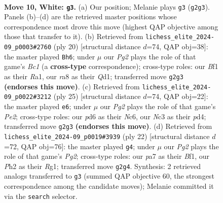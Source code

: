 \documentclass[11pt]{article}
\begin{document}
\clearpage

\begin{figure}[p]\centering
\begin{subfigure}{0.46\textwidth}\centering
\resizebox{\linewidth}{!}{%
\newchessgame
\chessboard[
  setfen={rnb1k2r/ppq1p1bp/3p1np1/4p3/4P3/2N1BQ2/PPP2PPP/2KR1B1R w kq - 0 10},
  showmover=false,
  pgfstyle=straightmove, color=movearrow, markmove={g2-g3}
]}
\caption{}
\end{subfigure}\hfill
\begin{subfigure}{0.46\textwidth}\centering
\resizebox{\linewidth}{!}{%
\newchessgame
\chessboard[
  setfen={rnbqk2r/4pp1p/p1pp1bp1/8/3P4/1Bp2N2/PPP2PPP/R1BQ1RK1 w kq - 0 11},
  showmover=false,
  pgfstyle=straightmove, color=movearrow, markmove={c1-h6}
]}
\caption{}
\end{subfigure}
\\[4pt]
\begin{subfigure}{0.46\textwidth}\centering
\resizebox{\linewidth}{!}{%
\newchessgame
\chessboard[
  setfen={2kr1b1r/ppp1pp1p/2n5/3q1p2/3Pb1P1/2P2N1P/PP2QPB1/R1B1R1K1 b - - 1 13},
  showmover=false,
  pgfstyle=straightmove, color=movearrow, markmove={e7-e6}
]}
\caption{}
\end{subfigure}\hfill
\begin{subfigure}{0.46\textwidth}\centering
\resizebox{\linewidth}{!}{%
\newchessgame
\chessboard[
  setfen={r1b1kb1r/2q2pp1/p1p2n2/1p2p2p/4P3/2N1BQ1P/PPP2PP1/2KR1BR1 w kq - 0 12},
  showmover=false,
  pgfstyle=straightmove, color=movearrow, markmove={g2-g4}
]}
\caption{}
\end{subfigure}
\caption{\textbf{Move 10, White: \texttt{g3}.} (a) Our position; Melanie plays \texttt{g3} (\texttt{g2g3}). Panels (b)--(d) are the retrieved master positions whose correspondence most drove this move (highest QAP objective among those that transfer to it). (b) Retrieved from \texttt{lichess\_elite\_2024-09\_p0003\#2760} (ply 20) [structural distance $d$=74, QAP obj=38]: the master played \texttt{Bh6}; under $\mu$ our \emph{Pg2} plays the role of that game's \emph{Bc1} (a \textbf{cross-type} correspondence); cross-type roles: our \emph{B}f1 as their \emph{R}a1, our \emph{r}a8 as their \emph{Q}d1; transferred move \texttt{g2g3} \textbf{(endorses this move)}. (c) Retrieved from \texttt{lichess\_elite\_2024-09\_p0022\#3212} (ply 25) [structural distance $d$=74, QAP obj=22]: the master played \texttt{e6}; under $\mu$ our \emph{Pg2} plays the role of that game's \emph{Pe2}; cross-type roles: our \emph{p}d6 as their \emph{N}c6, our \emph{N}c3 as their \emph{p}d4; transferred move \texttt{g2g3} \textbf{(endorses this move)}. (d) Retrieved from \texttt{lichess\_elite\_2024-09\_p0019\#3939} (ply 22) [structural distance $d$=72, QAP obj=76]: the master played \texttt{g4}; under $\mu$ our \emph{Pg2} plays the role of that game's \emph{Pg2}; cross-type roles: our \emph{p}a7 as their \emph{B}f1, our \emph{P}h2 as their \emph{R}g1; transferred move \texttt{g2g4}. Synthesis: 2 retrieved analogs transferred to \texttt{g3} (summed QAP objective 60, the strongest correspondence among the candidate moves); Melanie committed it via the \texttt{search} selector.}
\label{fig:thought-m18}
\end{figure}
\end{document}
